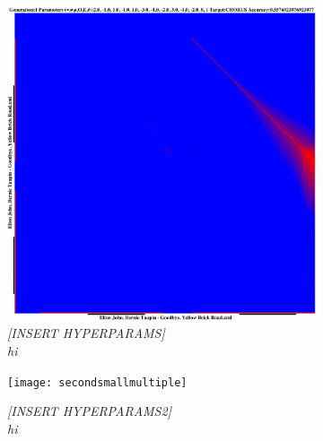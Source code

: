 \documentclass[letterpaper]{article}
\begin{document}
\begin{figure}[th]
    \centering
    \begin{subfigure}{.2\textwidth}
        \includegraphics[width=\linewidth]{firstsmallmultiple}
        \caption{\emph{[INSERT HYPERPARAMS]\\hi}}
    \end{subfigure}
   \begin{subfigure}{.2\textwidth}
        \texttt{[image: secondsmallmultiple]}
        \caption{\emph{[INSERT HYPERPARAMS2]\\hi}}
    \end{subfigure}
    \begin{subfigure}{.2\textwidth}

\end{subfigure}
\end{figure}
\end{document}
